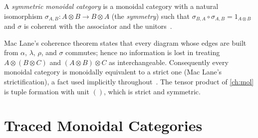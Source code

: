 \begin{definition}
A \emph{symmetric monoidal category} is a monoidal category with a natural
isomorphism $\sigma_{A,B} \colon A \otimes B \to B \otimes A$ (the
\emph{symmetry}) such that $\sigma_{B,A} \circ \sigma_{A,B} = 1_{A \otimes B}$
and $\sigma$ is coherent with the associator and the unitors~\cite{maclane}.
\end{definition}

\begin{remark}[Coherence]
Mac Lane's coherence theorem states that every diagram whose edges are built
from $\alpha$, $\lambda$, $\rho$, and $\sigma$ commutes; hence no information
is lost in treating $A \otimes (B \otimes C)$ and $(A \otimes B) \otimes C$
as interchangeable. Consequently every monoidal category is monoidally
equivalent to a strict one (Mac Lane's strictification), a fact used
implicitly throughout~\cite{maclane}. The tensor product of \autoref{ch:mol}
is tuple formation with unit $()$, which is strict and symmetric.
\end{remark}

\section{Traced Monoidal Categories}\label{sec:prelim-trace}

